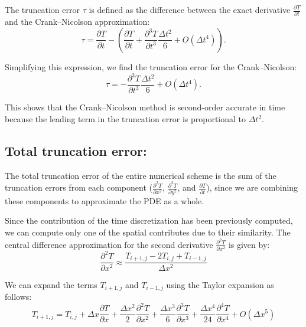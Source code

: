 \documentclass{article}
\begin{document}
The truncation error \( \tau \) is defined as the difference between the exact derivative $\frac{\partial T}{\partial t}$ and the Crank–Nicolson approximation:
\begin{equation*}
\tau = \frac{\partial T}{\partial t} - \left( \frac{\partial T}{\partial t} + \frac{\partial^3 T}{\partial t^3} \frac{\Delta t^2}{6} + O(\Delta t^4) \right).
\end{equation*}

Simplifying this expression, we find the truncation error for the Crank–Nicolson:
\begin{equation} 
\tau = -\frac{\partial^3 T}{\partial t^3} \frac{\Delta t^2}{6} + O(\Delta t^4). \label{truncation_error_time}
\end{equation}


This shows that the Crank–Nicolson method is second-order accurate in time because the leading term in the truncation error is proportional to \( \Delta t^2 \).

\subsection*{Total truncation error:}

The total truncation error of the entire numerical scheme is the sum of the truncation errors from each component ($\frac{\partial^2 T}{\partial x^2}$, $\frac{\partial^2 T}{\partial y^2}$, and $\frac{\partial T}{\partial t}$), since we are combining these components to approximate the PDE as a whole.

Since the contribution of the time discretization has been previously computed, we can compute only one of the spatial contributes due to their similarity.
The central difference approximation for the second derivative $\frac{\partial^2 T}{\partial x^2}$ is given by:
\begin{equation}
  \frac{\partial^2 T}{\partial x^2} \approx \frac{T_{i+1,j} - 2T_{i,j} + T_{i-1,j}}{\Delta x^2} 
\end{equation}

We can expand the terms $T_{i+1,j}$ and $T_{i-1,j}$ using the Taylor expansion as follows:
\begin{equation}
  T_{i+1,j} = T_{i,j} + \Delta x \frac{\partial T}{\partial x} + \frac{\Delta x^2}{2} \frac{\partial^2 T}{\partial x^2} + \frac{\Delta x^3}{6} \frac{\partial^3 T}{\partial x^3} + \frac{\Delta x^4}{24} \frac{\partial^4 T}{\partial x^4} + O(\Delta x^5)
\end{equation}
  
\end{document}
